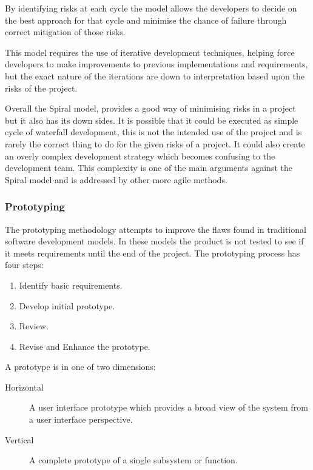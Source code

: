 \documentclass[11pt,a4paper]{article}
\begin{document}
By identifying risks at each cycle the model allows the developers to decide on the best approach for that cycle and minimise the chance of failure through correct mitigation of those risks. 

This model requires the use of iterative development techniques, helping force developers to make improvements to previous implementations and requirements, but the exact nature of the iterations are down to interpretation based upon the risks of the project.

Overall the Spiral model, provides a good way of minimising risks in a project but it also has its down sides. It is possible that it could be executed as simple cycle of waterfall development, this is not the intended use of the project and is rarely the correct thing to do for the given risks of a project. It could also create an overly complex development strategy which becomes confusing to the development team. This complexity is one of the main arguments against the Spiral model and is addressed by other more agile methods. 

\subsubsection{Prototyping}
The prototyping methodology attempts to improve the flaws found in traditional software development models. In these models the product is not tested to see if it meets requirements until the end of the project. The prototyping process has four steps:
\begin{enumerate}
\item Identify basic requirements.
\item Develop initial prototype.
\item Review.
\item Revise and Enhance the prototype.
\end{enumerate}

A prototype is in one of two dimensions:
\begin{description}
\item[Horizontal] A user interface prototype which provides a broad view of the system from a user interface perspective. 
\item[Vertical] A complete prototype of a single subsystem or function.
\end{description}
\end{document}
